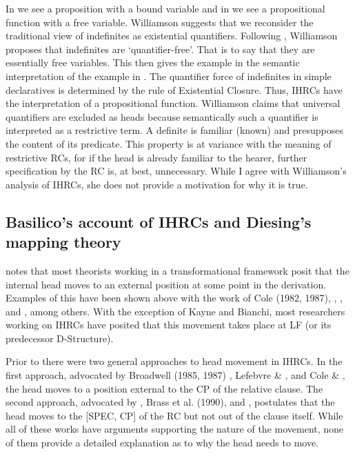\documentclass[output=paper]{LSP/langsci}
\begin{document}
In  we see a proposition with a bound variable and in  we see a propositional function with a free variable. Williamson suggests that we reconsider the traditional view of indefinites as existential quantifiers. Following \citet{Heim1982}, Williamson proposes that indefinites are `quantifier-free'. That is to say that they are essentially free variables. This then gives the example in  the semantic interpretation of the example in . The quantifier force of indefinites in simple declaratives is determined by the rule of Existential Closure. Thus, IHRCs have the interpretation of a propositional function. Williamson claims that universal quantifiers are excluded as heads because semantically such a quantifier is interpreted as a restrictive term. A definite is familiar (known) and presupposes the content of its predicate.  This property is at variance with the meaning of restrictive RCs, for if the head is already familiar to the hearer, further specification by the RC is, at best, unnecessary.  While I agree with Williamson's analysis of IHRCs, she does not provide a motivation for why it is true.

\subsection{Basilico's account of IHRCs and Diesing's mapping theory}

\citet{Basilico1996} notes that most theorists working in a transformational framework posit that the internal head moves to an external position at some point in the derivation. Examples of this have been shown above with the work of Cole (1982, 1987), \citet{Williamson1987}, \citet{Culy1990}, \citet{Kayne1994} and \citet{Bianchi1999}, among others. With the exception of Kayne and Bianchi, most researchers working on IHRCs have posited that this movement takes place at LF (or its predecessor D-Structure). 

Prior to \citet{Basilico1996} there were two general approaches to head movement in IHRCs. In the first approach, advocated by Broadwell (1985, 1987) \citet{Cole1987}, Lefebvre \& \citet{Muysken1988}, and Cole \& \citet{Hermon1994}, the head moves to a position external to the CP of the relative clause. The second approach, advocated by \citet{Williamson1987}, Brass et al. (1990), and \citet{Bonneau1992}, postulates that the head moves to the [SPEC, CP] of the RC but not out of the clause itself. While all of these works have arguments supporting the nature of the movement, none of them provide a detailed explanation as to why the head needs to move.  
\end{document}
